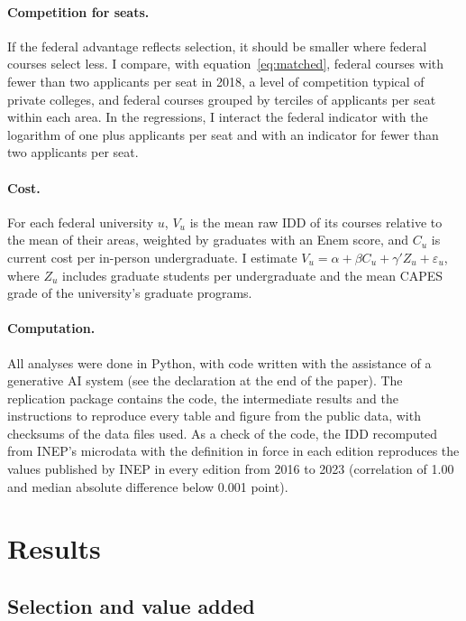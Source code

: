 \documentclass[12pt,letterpaper]{article}
\begin{document}
\paragraph{Competition for seats.} If the federal advantage reflects selection, it should be smaller where federal courses select less. I compare, with equation~\eqref{eq:matched}, federal courses with fewer than two applicants per seat in 2018, a level of competition typical of private colleges, and federal courses grouped by terciles of applicants per seat within each area. In the regressions, I interact the federal indicator with the logarithm of one plus applicants per seat and with an indicator for fewer than two applicants per seat.

\paragraph{Cost.} For each federal university $u$, $V_u$ is the mean raw IDD of its courses relative to the mean of their areas, weighted by graduates with an Enem score, and $C_u$ is current cost per in-person undergraduate. I estimate $V_u=\alpha+\beta C_u+\gamma'Z_u+\varepsilon_u$, where $Z_u$ includes graduate students per undergraduate and the mean CAPES grade of the university's graduate programs.

\paragraph{Computation.} All analyses were done in Python, with code written with the assistance of a generative AI system (see the declaration at the end of the paper). The replication package contains the code, the intermediate results and the instructions to reproduce every table and figure from the public data, with checksums of the data files used. As a check of the code, the IDD recomputed from INEP's microdata with the definition in force in each edition reproduces the values published by INEP in every edition from 2016 to 2023 (correlation of 1.00 and median absolute difference below 0.001 point).

\section{Results}\label{sec:results}

\subsection{Selection and value added}
\end{document}
